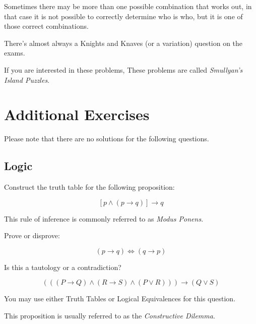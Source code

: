 \begin{remark}
    Sometimes there may be more than one possible combination that works out,
    in that case it is not possible to correctly determine who is who, but it
    is one of those correct combinations.
\end{remark}

\begin{remark}
    There's almost always a Knights and Knaves (or a variation) question on the
    exams.
\end{remark}

\begin{remark}
    If you are interested in these problems, These problems are called
    \emph{Smullyan's Island Puzzles}.
\end{remark}

\section{Additional Exercises}
Please note that there are no solutions for the following questions.

\subsection{Logic}
\begin{question}
    Construct the truth table for the following proposition:

    \[
        [p \wedge (p \rightarrow q)] \rightarrow q
    \]

    This rule of inference is commonly referred to as \emph{Modus Ponens}.
\end{question}

\begin{question}
    Prove or disprove:

    \[
        (p \rightarrow q) \Leftrightarrow (q \rightarrow p)
    \]
\end{question}

\begin{question}
    Is this a tautology or a contradiction?

    \[
        (( (P \rightarrow Q) \wedge (R \rightarrow S) \wedge (P \vee R))) \rightarrow
        (Q \vee S)
    \]

    You may use either Truth Tables or Logical Equivalences for this question.

    This proposition is usually referred to as the \emph{Constructive
    Dilemma}.
\end{question}


